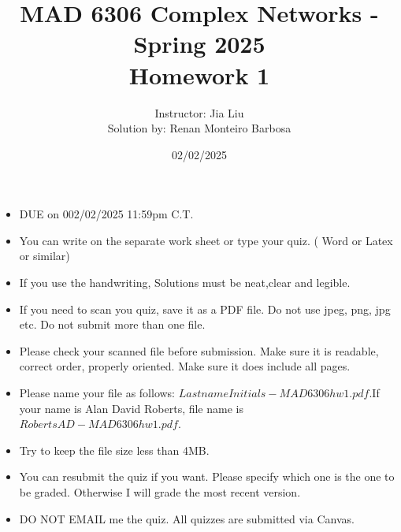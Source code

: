 \documentclass{amsart}
\theoremstyle{definition}
\theoremstyle{remark}
\numberwithin{equation}{section}
\begin{document}
\title{MAD 6306 Complex Networks  - Spring 2025\\{\bf Homework 1}}%
\author{Instructor: Jia Liu \\ Solution by: Renan Monteiro Barbosa}%
\date{02/02/2025}


\maketitle
\begin{itemize}
\item DUE on 002/02/2025 11:59pm C.T.
\item You can write on the separate work sheet or type your quiz. ( Word or Latex or similar)
\item If you use the handwriting, Solutions must be neat,clear and legible.
\item If you need to scan you quiz, save it as a PDF file. Do not use jpeg, png, jpg etc. Do not submit more than one file.
\item Please check your scanned file before submission. Make sure it is readable, correct order, properly oriented. Make sure it does include all pages.
\item Please name your file as follows: $LastnameInitials-MAD6306hw1.pdf$.If your name is Alan David Roberts, file name is $RobertsAD-MAD6306hw1.pdf$.
\item Try to keep the file size less than 4MB.
\item You can resubmit the quiz if you want. Please specify which one is the one to be graded. Otherwise I will grade the most recent version.
\item DO NOT EMAIL me the quiz. All quizzes are submitted via Canvas.
\end{itemize}
\end{document}

